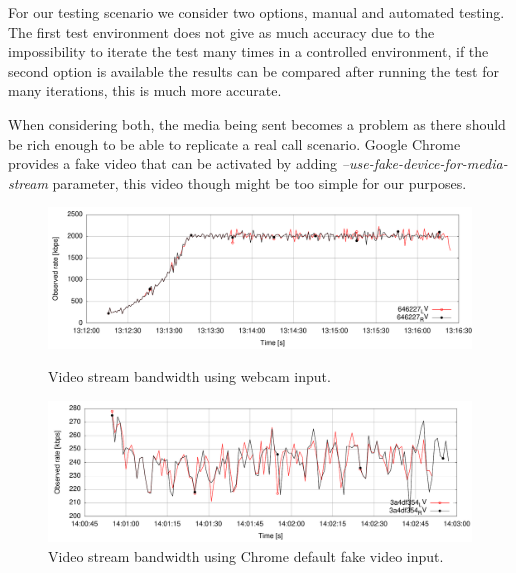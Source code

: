 For our testing scenario we consider two options, manual and automated testing. The first test environment does not give as much accuracy due to the impossibility to iterate the test many times in a controlled environment, if the second option is available the results can be compared after running the test for many iterations, this is much more accurate.

When considering both, the media being sent becomes a problem as there should be rich enough to be able to replicate a real call scenario. Google Chrome provides a fake video that can be activated by adding {\it --use-fake-device-for-media-stream} parameter, this video though might be too simple for our purposes.


 \begin{figure}[h]
  \centering
   \includegraphics[width=1\textwidth]{./figures/realVideoChrome.pdf}
     \caption[Video stream bandwidth using webcam]{Video stream bandwidth using webcam input.}
	\label{fig:realVideoChrome}
  \centering
	\includegraphics[width=1\textwidth]{./figures/automatedVideoChrome.pdf}
	\caption[Video stream bandwidth using Chrome default fake content]{Video stream bandwidth using Chrome default fake video input.}
	\label{fig:automatedVideoChrome}
\end{figure}

